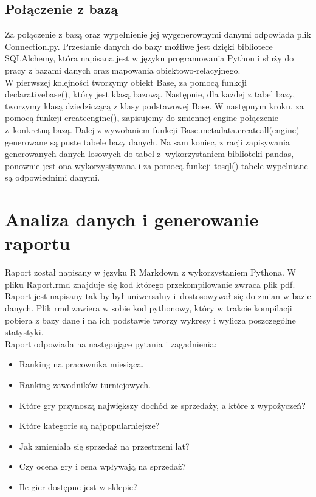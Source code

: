 \documentclass{article}
\begin{document}
	\subsection{Połączenie z bazą}
	Za połączenie z bazą oraz wypełnienie jej wygenerownymi danymi odpowiada plik Connection.py. Przesłanie danych do bazy możliwe jest dzięki bibliotece SQLAlchemy, która napisana jest w języku programowania Python i służy do pracy z bazami danych oraz mapowania obiektowo-relacyjnego.\\
	
	
	\noindent W pierwszej kolejności tworzymy obiekt Base, za pomocą funkcji declarative\textunderscore base(), który jest klasą bazową. Następnie, dla każdej z tabel bazy, tworzymy klasą dziedziczącą z klasy podstawowej Base. W następnym kroku, za pomocą funkcji create\textunderscore engine(), zapisujemy do zmiennej engine połączenie z~konkretną bazą. Dalej z wywołaniem funkcji Base.metadata.create\textunderscore all(engine) generowane są puste tabele bazy danych. Na sam koniec, z racji zapisywania generowanych danych losowych do tabel z~wykorzystaniem biblioteki pandas, ponownie jest ona wykorzystywana i za pomocą funkcji to\textunderscore sql() tabele wypelniane są odpowiednimi danymi.
	
	
	
	\section{Analiza danych i generowanie raportu}
	
	Raport został napisany w języku R Markdown z wykorzystaniem Pythona. W pliku Raport.rmd znajduje się kod którego przekompilowanie zwraca plik pdf. Raport jest napisany tak by był uniwersalny i~dostosowywał się do zmian w bazie danych. Plik rmd zawiera w sobie kod pythonowy, który w trakcie kompilacji pobiera z bazy dane i na ich podstawie tworzy wykresy i wylicza poszczególne statystyki.\\

	\noindent Raport odpowiada na następujące pytania i zagadnienia:
	\begin{itemize}
		\item Ranking na pracownika miesiąca.
		\item Ranking zawodników turniejowych.
		\item Które gry przynoszą największy dochód ze sprzedaży, a które z wypożyczeń?
		\item Które kategorie są najpopularniejsze?
		\item Jak zmieniała się sprzedaż na przestrzeni lat?
		\item Czy ocena gry i cena wpływają na sprzedaż?
		\item Ile gier dostępne jest w sklepie?
	\end{itemize}
\end{document}
